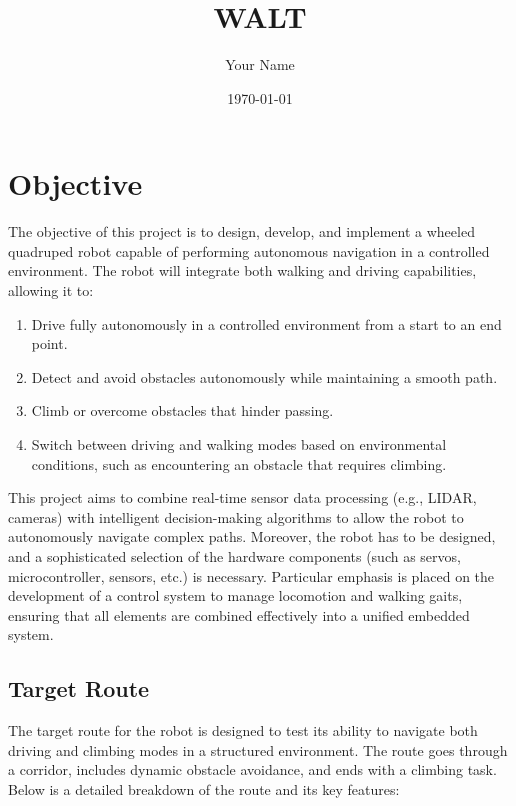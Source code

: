 \documentclass{article}
\begin{document}
\title{WALT}
\author{Your Name}
\date{\today}

\maketitle

\section{Objective}

The objective of this project is to design, develop, and implement a wheeled quadruped robot capable of performing autonomous navigation in a controlled environment. The robot will integrate both walking and driving capabilities, allowing it to:

\begin{enumerate}
    \item Drive fully autonomously in a controlled environment from a start to an end point.
    \item Detect and avoid obstacles autonomously while maintaining a smooth path.
    \item Climb or overcome obstacles that hinder passing.
    \item Switch between driving and walking modes based on environmental conditions, such as encountering an obstacle that requires climbing.
\end{enumerate}

This project aims to combine real-time sensor data processing (e.g., LIDAR, cameras) with intelligent decision-making algorithms to allow the robot to autonomously navigate complex paths. Moreover, the robot has to be designed, and a sophisticated selection of the hardware components (such as servos, microcontroller, sensors, etc.) is necessary. Particular emphasis is placed on the development of a control system to manage locomotion and walking gaits, ensuring that all elements are combined effectively into a unified embedded system.

\subsection{Target Route}

The target route for the robot is designed to test its ability to navigate both driving and climbing modes in a structured environment. The route goes through a corridor, includes dynamic obstacle avoidance, and ends with a climbing task. Below is a detailed breakdown of the route and its key features:
\end{document}
